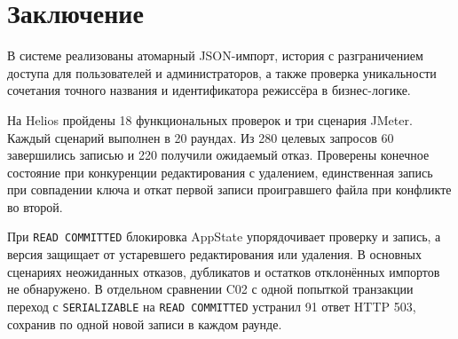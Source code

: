 \section{Заключение}
В системе реализованы атомарный JSON-импорт, история с разграничением доступа для пользователей и администраторов, а также проверка уникальности сочетания точного названия и идентификатора режиссёра в бизнес-логике.

На Helios пройдены 18 функциональных проверок и три сценария JMeter. Каждый сценарий выполнен в 20 раундах. Из 280 целевых запросов 60 завершились записью и 220 получили ожидаемый отказ. Проверены конечное состояние при конкуренции редактирования с удалением, единственная запись при совпадении ключа и откат первой записи проигравшего файла при конфликте во второй.

При \texttt{READ COMMITTED} блокировка AppState упорядочивает проверку и запись, а версия защищает от устаревшего редактирования или удаления. В основных сценариях неожиданных отказов, дубликатов и остатков отклонённых импортов не обнаружено. В отдельном сравнении C02 с одной попыткой транзакции переход с \texttt{SERIALIZABLE} на \texttt{READ COMMITTED} устранил 91 ответ HTTP 503, сохранив по одной новой записи в каждом раунде.
